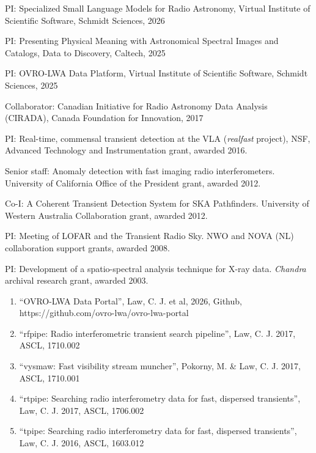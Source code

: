 \documentclass[11pt]{article}
\renewcommand{\section}[1]{\pagebreak[3]%
    \vspace{1.3\baselineskip}%
    \phantomsection\addcontentsline{toc}{section}{#1}%
    \noindent\llap{\scshape\smash{\parbox[t]{\marginparwidth}{\hyphenpenalty=10000\raggedright #1}}}%
    \vspace{-\baselineskip}\par}
\begin{document}
\begin{bibsection}

  \item PI: Specialized Small Language Models for Radio Astronomy, Virtual Institute of Scientific Software, Schmidt Sciences, 2026

  \item PI: Presenting Physical Meaning with Astronomical Spectral Images and Catalogs, Data to Discovery, Caltech, 2025

  \item PI: OVRO-LWA Data Platform, Virtual Institute of Scientific Software, Schmidt Sciences, 2025

  \item Collaborator: Canadian Initiative for Radio Astronomy Data Analysis (CIRADA), Canada Foundation for Innovation, 2017

  \item PI: Real-time, commensal transient detection at the VLA (\emph{realfast} project), NSF, Advanced Technology and Instrumentation grant, awarded 2016.

  \item Senior staff: Anomaly detection with fast imaging radio interferometers. University of California Office of the President grant, awarded 2012.

  \item Co-I: A Coherent Transient Detection System for SKA Pathfinders. University of Western Australia Collaboration grant, awarded 2012.

  \item PI: Meeting of LOFAR and the Transient Radio Sky. NWO and NOVA (NL) collaboration support grants, awarded 2008.

  \item PI: Development of a spatio-spectral analysis technique for X-ray data. \emph{Chandra} archival research grant, awarded 2003.

\end{bibsection}


\section{Software}
\begin{enumerate}
    \item ``OVRO-LWA Data Portal'', Law, C. J. et al, 2026, Github, https://github.com/ovro-lwa/ovro-lwa-portal

    \item ``rfpipe: Radio interferometric transient search pipeline'', Law, C. J. 2017, ASCL, 1710.002
    
    \item ``vysmaw: Fast visibility stream muncher'', Pokorny, M. \& Law, C. J. 2017, ASCL, 1710.001

    \item ``rtpipe: Searching radio interferometry data for fast, dispersed transients'', Law, C. J. 2017, ASCL, 1706.002

    \item ``tpipe: Searching radio interferometry data for fast, dispersed transients'', Law, C. J. 2016, ASCL, 1603.012
\end{enumerate}
\end{document}

